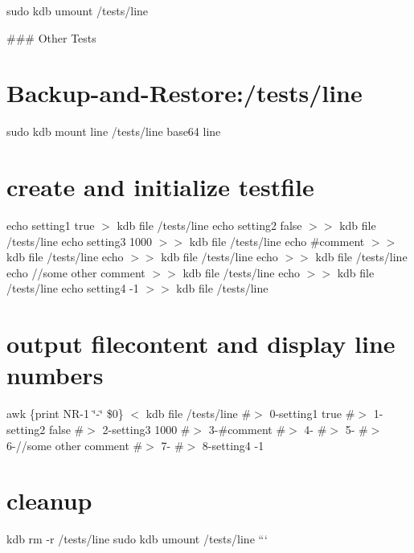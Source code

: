 sudo kdb umount /tests/line 
\begin{DoxyCode}
### Other Tests
\end{DoxyCode}
 \hypertarget{autotoc_md346_autotoc_md352}{}\section{Backup-\/and-\/\+Restore\+:/tests/line}\label{autotoc_md346_autotoc_md352}
sudo kdb mount line /tests/line base64 line\hypertarget{autotoc_md346_autotoc_md353}{}\section{create and initialize testfile}\label{autotoc_md346_autotoc_md353}
echo \textquotesingle{}setting1 true\textquotesingle{} $>$ {\ttfamily kdb file /tests/line} echo \textquotesingle{}setting2 false\textquotesingle{} $>$$>$ {\ttfamily kdb file /tests/line} echo \textquotesingle{}setting3 1000\textquotesingle{} $>$$>$ {\ttfamily kdb file /tests/line} echo \textquotesingle{}\#comment\textquotesingle{} $>$$>$ {\ttfamily kdb file /tests/line} echo $>$$>$ {\ttfamily kdb file /tests/line} echo $>$$>$ {\ttfamily kdb file /tests/line} echo \textquotesingle{}//some other comment\textquotesingle{} $>$$>$ {\ttfamily kdb file /tests/line} echo $>$$>$ {\ttfamily kdb file /tests/line} echo \textquotesingle{}setting4 -\/1\textquotesingle{} $>$$>$ {\ttfamily kdb file /tests/line}\hypertarget{autotoc_md346_autotoc_md354}{}\section{output filecontent and display line numbers}\label{autotoc_md346_autotoc_md354}
awk \textquotesingle{}\{print N\+R-\/1 \char`\"{}-\/\char`\"{} \$0\}\textquotesingle{} $<$ {\ttfamily kdb file /tests/line} \#$>$ 0-\/setting1 true \#$>$ 1-\/setting2 false \#$>$ 2-\/setting3 1000 \#$>$ 3-\/\#comment \#$>$ 4-\/ \#$>$ 5-\/ \#$>$ 6-\///some other comment \#$>$ 7-\/ \#$>$ 8-\/setting4 -\/1\hypertarget{autotoc_md346_autotoc_md355}{}\section{cleanup}\label{autotoc_md346_autotoc_md355}
kdb rm -\/r /tests/line sudo kdb umount /tests/line ``` 